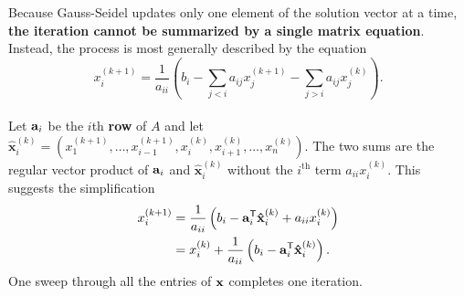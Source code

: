 Because Gauss-Seidel updates only one element of the solution vector at a time, \textbf{the iteration cannot be summarized by a single matrix equation}.
Instead, the process is most generally described by the equation
\begin{equation}
\label{eq:gauss-seidel-full}
x^{(k+1)}_i = \frac{1}{a_{ii}} \left(b_i - \sum_{j < i}a_{ij}x^{(k+1)}_j - \sum_{j > i}a_{ij}x^{(k)}_j \right).
\end{equation}
\\
Let $\mathbf{a}_i$ be the $i$th \textbf{row} of $A$ and let $\mathbf{\hat{x}}^{(k)}_i = (x^{(k+1)}_1,\ldots, x^{(k+1)}_{i-1}, x^{(k)}_i, x^{(k)}_{i+1},\ldots, x^{(k)}_n)$.
The two sums are the regular vector product of $\mathbf{a}_i$ and $\mathbf{\hat{x}}^{(k)}_i$ without the $i^{\text{th}}$ term $a_{ii}x^{(k)}_i$.
This suggests the simplification
\begin{align}
\nonumber x^{(k+1)}_i &= \frac{1}{a_{ii}} \left(b_i - \mathbf{a}_i^{\mathsf T}\mathbf{\hat{x}}^{(k)}_i + a_{ii}x^{(k)}_i \right)\\
&= x^{(k)}_i + \frac{1}{a_{ii}}\left( b_i - \mathbf{a}_i^{\mathsf T}\mathbf{\hat{x}}^{(k)}_i\right).
\label{eq:gauss_seidel}
\end{align}
One sweep through all the entries of $\mathbf{x}$ completes one iteration.


